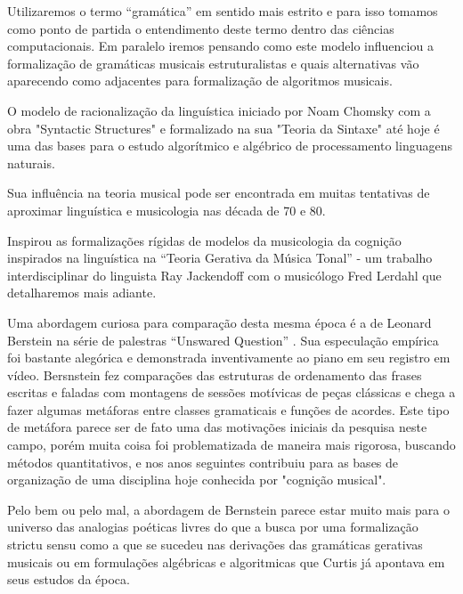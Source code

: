 \documentclass[
	12pt,				%
	openright,			%
	twoside,			%
	a4paper,			%
	english,			%
	french,				%
	spanish,			%
	brazil				%
	]{abntex2}
\begin{document}
Utilizaremos o termo “gramática” em sentido mais estrito e para isso tomamos como ponto de partida o entendimento deste termo dentro das ciências computacionais. Em paralelo iremos pensando como este modelo influenciou a formalização de gramáticas musicais estruturalistas e quais alternativas vão aparecendo como adjacentes para formalização de algoritmos musicais.

O modelo de racionalização da linguística iniciado por Noam Chomsky com a obra "Syntactic Structures" \cite{chomsky1957syntactic} e formalizado na sua "Teoria da Sintaxe"\cite{chomsky1965aspects}  até hoje é uma das bases para o estudo algorítmico e algébrico de processamento linguagens naturais.  

Sua influência na teoria musical pode ser encontrada em muitas tentativas de aproximar linguística e musicologia nas década de 70 e 80.

Inspirou as formalizações rígidas de modelos da musicologia da cognição inspirados na linguística na “Teoria Gerativa da Música Tonal” \cite{lerdahl1983generative} - um trabalho interdisciplinar do linguista Ray Jackendoff com o musicólogo Fred Lerdahl que detalharemos mais adiante.

Uma abordagem curiosa para comparação desta mesma época é a de Leonard Berstein na série de palestras “Unswared Question” \cite{bernstein1976unanswered}. Sua especulação empírica foi bastante alegórica e demonstrada inventivamente ao piano em seu registro em vídeo. Bersnstein fez comparações das estruturas de ordenamento das frases escritas e faladas com montagens de sessões motívicas de peças clássicas e chega a fazer algumas metáforas entre classes gramaticais e funções de acordes. Este tipo de metáfora parece ser de fato uma das motivações iniciais da pesquisa neste campo, porém muita coisa foi problematizada de maneira mais rigorosa, buscando métodos quantitativos, e nos anos seguintes contribuiu para as bases de organização de uma disciplina hoje conhecida por "cognição musical".

Pelo bem ou pelo mal, a abordagem de Bernstein parece estar muito mais para o universo das analogias poéticas livres do que a busca por uma formalização strictu sensu \cite{lerdahl2009genesis} como a que se sucedeu nas derivações das gramáticas gerativas musicais \cite{lerdahl1983generative,temperley2001cognition} ou em formulações algébricas e algoritmicas que Curtis  já apontava em seus estudos da época.

 
\end{document}
